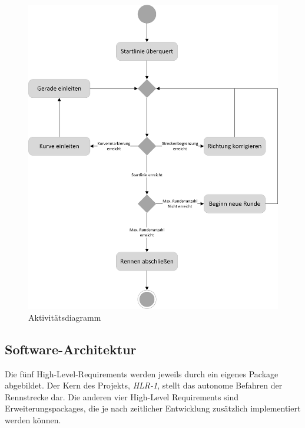 \documentclass[a4paper,12pt]{article}                                         %
\numberwithin{table}{section}                               %
\numberwithin{figure}{section}                              %
\begin{document}
		\begin{figure}[h]
			\includegraphics[scale=0.9]{../Bilder/Aktivitaetsdiagramm.png}
			\newline
			\caption{Aktivitätsdiagramm}
		\end{figure}
		
	\newpage
	\subsection{Software-Architektur}
	Die fünf High-Level-Requirements werden jeweils durch ein eigenes Package abgebildet. Der Kern des Projekts, \textit{HLR-1}, stellt das autonome Befahren der Rennstrecke dar. Die anderen vier High-Level Requirements sind Erweiterungspackages, die je nach zeitlicher Entwicklung zusätzlich implementiert werden können.
	
\end{document}
